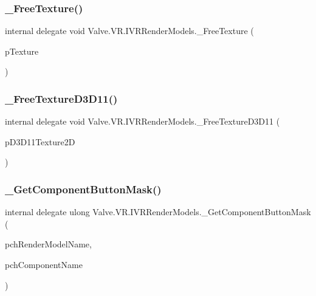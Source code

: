 \subsubsection{\texorpdfstring{\_FreeTexture()}{\_FreeTexture()}}
{\footnotesize\ttfamily internal delegate void Valve.\+V\+R.\+I\+V\+R\+Render\+Models.\+\_\+\+Free\+Texture (\begin{DoxyParamCaption}\item[{Int\+Ptr}]{p\+Texture }\end{DoxyParamCaption})}

\mbox{\label{struct_valve_1_1_v_r_1_1_i_v_r_render_models_a64addc40cba89770ceaf1e258ab4d793}} 
\subsubsection{\texorpdfstring{\_FreeTextureD3D11()}{\_FreeTextureD3D11()}}
{\footnotesize\ttfamily internal delegate void Valve.\+V\+R.\+I\+V\+R\+Render\+Models.\+\_\+\+Free\+Texture\+D3\+D11 (\begin{DoxyParamCaption}\item[{Int\+Ptr}]{p\+D3\+D11\+Texture2D }\end{DoxyParamCaption})}

\mbox{\label{struct_valve_1_1_v_r_1_1_i_v_r_render_models_a5a1b0a485a820f88672d43c1ab53cf09}} 
\subsubsection{\texorpdfstring{\_GetComponentButtonMask()}{\_GetComponentButtonMask()}}
{\footnotesize\ttfamily internal delegate ulong Valve.\+V\+R.\+I\+V\+R\+Render\+Models.\+\_\+\+Get\+Component\+Button\+Mask (\begin{DoxyParamCaption}\item[{string}]{pch\+Render\+Model\+Name,  }\item[{string}]{pch\+Component\+Name }\end{DoxyParamCaption})}

